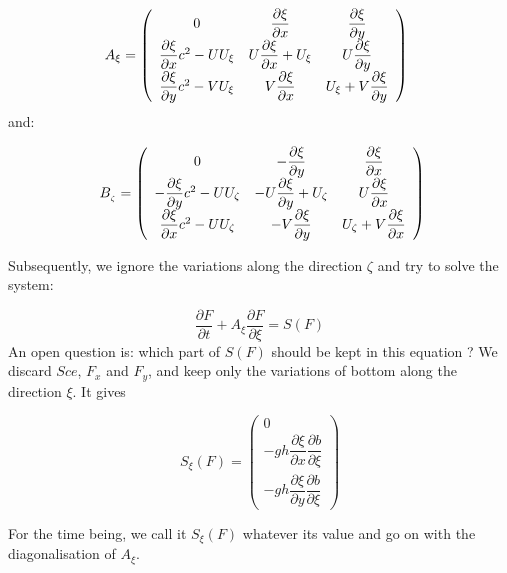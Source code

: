 \begin{equation}
A_{\xi }=\left( 
\begin{array}{ccc}
0 & \dfrac{\partial \xi }{\partial x} & \dfrac{\partial \xi }{\partial y} \\ 
\dfrac{\partial \xi }{\partial x}c^{2}-UU_{\xi } & U\dfrac{\partial \xi }{%
\partial x}+U_{\xi } & U\dfrac{\partial \xi }{\partial y} \\ 
\dfrac{\partial \xi }{\partial y}c^{2}-VU_{\xi } & V\dfrac{\partial \xi }{%
\partial x} & U_{\xi }+V\dfrac{\partial \xi }{\partial y}%
\end{array}
\right) \text{ }
\end{equation}
and:

\begin{equation}
\text{ }B_{_{\zeta }}=\left( 
\begin{array}{ccc}
0 & -\dfrac{\partial \xi }{\partial y} & \dfrac{\partial \xi }{\partial x}
\\ 
-\dfrac{\partial \xi }{\partial y}c^{2}-UU_{\zeta } & -U\dfrac{\partial \xi 
}{\partial y}+U_{\zeta } & U\dfrac{\partial \xi }{\partial x} \\ 
\dfrac{\partial \xi }{\partial x}c^{2}-UU_{\zeta } & -V\dfrac{\partial \xi }{%
\partial y} & U_{\zeta }+V\dfrac{\partial \xi }{\partial x}%
\end{array}
\right)
\end{equation}

Subsequently, we ignore the variations along the direction $\zeta $ and try
to solve the system:

\begin{equation}
\dfrac{\partial F}{\partial t}+A_{\xi }\dfrac{\partial F}{\partial \xi }=S(F)
\end{equation}
An open question is: which part of $S(F)$ should be kept in this equation ?
We discard $Sce$, $F_{x}$ and $F_{y}$, and keep only the variations of
bottom along the direction $\xi $. It gives

\begin{equation}
S_{\xi }(F)=\left( 
\begin{array}{c}
0 \\ 
-gh\dfrac{\partial \xi }{\partial x}\dfrac{\partial b}{\partial \xi } \\ 
-gh\dfrac{\partial \xi }{\partial y}\dfrac{\partial b}{\partial \xi }%
\end{array}
\right)
\end{equation}

For the time being, we call it $S_{\xi }(F)$ whatever its value and go on
with the diagonalisation of $A_{\xi }$.

